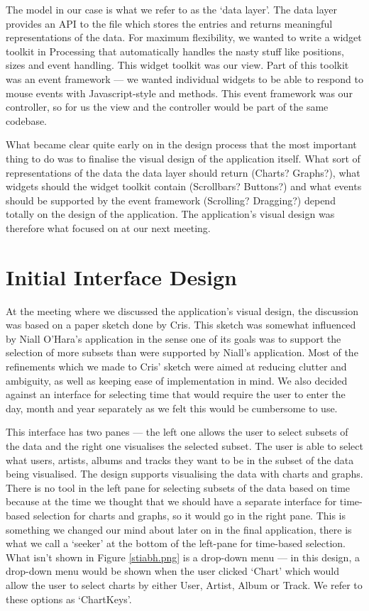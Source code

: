 The model in our case is what we refer to as the `data layer'. The data layer provides an API to the file which stores the entries and returns meaningful representations of the data. For maximum flexibility, we wanted to write a widget toolkit in Processing that automatically handles the nasty stuff like positions, sizes and event handling. This widget toolkit was our view. Part of this toolkit was an event framework --- we wanted individual widgets to be able to respond to mouse events with Javascript-style  and  methods. This event framework was our controller, so for us the view and the controller would be part of the same codebase.

What became clear quite early on in the design process that the most important thing to do was to finalise the visual design of the application itself. What sort of representations of the data the data layer should return (Charts? Graphs?), what widgets should the widget toolkit contain (Scrollbars? Buttons?) and what events should be supported by the event framework (Scrolling? Dragging?) depend totally on the design of the application. The application's visual design was therefore what focused on at our next meeting.

\section{Initial Interface Design}
At the meeting where we discussed the application's visual design, the discussion was based on a paper sketch done by Cris. This sketch was somewhat influenced by Niall O'Hara's application in the sense one of its goals was to support the selection of more subsets than were supported by Niall's application. Most of the refinements which we made to Cris' sketch were aimed at reducing clutter and ambiguity, as well as keeping ease of implementation in mind. We also decided against an interface for selecting time that would require the user to enter the day, month and year separately as we felt this would be cumbersome to use.


This interface has two panes --- the left one allows the user to select subsets of the data and the right one visualises the selected subset. The user is able to select what users, artists, albums and tracks they want to be in the subset of the data being visualised. The design supports visualising the data with charts and graphs. There is no tool in the left pane for selecting subsets of the data based on time because at the time we thought that we should have a separate interface for time-based selection for charts and graphs, so it would go in the right pane. This is something we changed our mind about later on in the final application, there is what we call a `seeker' at the bottom of the left-pane for time-based selection. What isn't shown in Figure \ref{stiabh.png} is a drop-down menu --- in this design, a drop-down menu would be shown when the user clicked `Chart' which would allow the user to select charts by either User, Artist, Album or Track. We refer to these options as `ChartKeys'.

